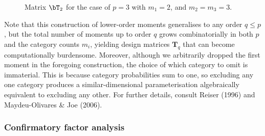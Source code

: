 \documentclass[
  letterpaper,
  DIV=11,
  numbers=noendperiod]{scrartcl}
\begin{document}
\begin{figure}


\caption{\label{fig-T2-matrix}Matrix \(\bT_2\) for the case of \(p=3\)
with \(m_1=2\), and \(m_2=m_3=3\).}

\end{figure}%

Note that this construction of lower-order moments generalises to any
order \(q \le p\), but the total number of moments up to order \(q\)
grows combinatorially in both \(p\) and the category counts \(m_i\),
yielding design matrices \(\mathbf{T}_q\) that can become
computationally burdensome. Moreover, although we arbitrarily dropped
the first moment in the foregoing construction, the choice of which
category to omit is immaterial. This is because category probabilities
sum to one, so excluding any one category produces a similar-dimensional
parameterisation algebraically equivalent to excluding any other. For
further details, consult Reiser (1996) and Maydeu-Olivares \& Joe
(2006).

\subsubsection{Confirmatory factor
analysis}\label{confirmatory-factor-analysis}
\end{document}
